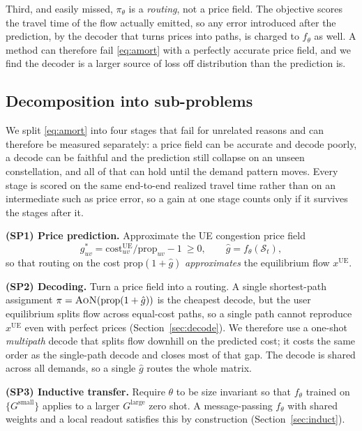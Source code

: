 \documentclass[journal]{IEEEtran}
\newcommand{\cost}{\mathrm{cost}}
\newcommand{\prop}{\mathrm{prop}}
\newcommand{\AoN}{\textsc{AoN}}
\begin{document}
Third, and easily missed, $\pi_\theta$ is a \emph{routing}, not a price field. The objective scores
the travel time of the flow actually emitted, so any error introduced after the prediction, by the
decoder that turns prices into paths, is charged to $f_\theta$ as well. A method can therefore fail
\eqref{eq:amort} with a perfectly accurate price field, and we find the decoder is a larger source
of loss off distribution than the prediction is.

\subsection{Decomposition into sub-problems}
We split \eqref{eq:amort} into four stages that fail for unrelated reasons and can therefore be measured separately: a price field can be accurate and decode poorly, a decode can be faithful and the prediction still collapse on an unseen constellation, and all of that can hold until the demand pattern moves. Every stage is scored on the same end-to-end realized travel time rather than on an intermediate such as price error, so a gain at one stage counts only if it survives the stages after it.

\noindent\textbf{(SP1) Price prediction.} Approximate the UE congestion price field
\begin{equation}
g^{*}_{uv}=\cost^{\mathrm{UE}}_{uv}/\prop_{uv}-1\ \ge 0,
\qquad \hat g = f_\theta(\mathcal{S}_t),
\label{eq:price}
\end{equation}
so that routing on the cost $\prop(1+\hat g)$ \emph{approximates} the equilibrium flow
$x^{\mathrm{UE}}$.

\noindent\textbf{(SP2) Decoding.} Turn a price field into a routing. A single
shortest-path assignment $\pi=\AoN(\prop(1+\hat g))$ is the cheapest decode, but the user
equilibrium splits flow across equal-cost paths, so a single path cannot reproduce
$x^{\mathrm{UE}}$ even with perfect prices (Section~\ref{sec:decode}). We therefore use a
one-shot \emph{multipath} decode that splits flow downhill on the predicted cost; it
costs the same order as the single-path decode and closes most of that gap. The decode is
shared across all demands, so a single $\hat g$ routes the whole matrix.

\noindent\textbf{(SP3) Inductive transfer.} Require $\theta$ to be size invariant so that
$f_\theta$ trained on $\{G^{\mathrm{small}}\}$ applies to a larger $G^{\mathrm{large}}$
zero shot. A message-passing $f_\theta$ with shared weights and a
local readout satisfies this by construction (Section~\ref{sec:induct}).
\end{document}
